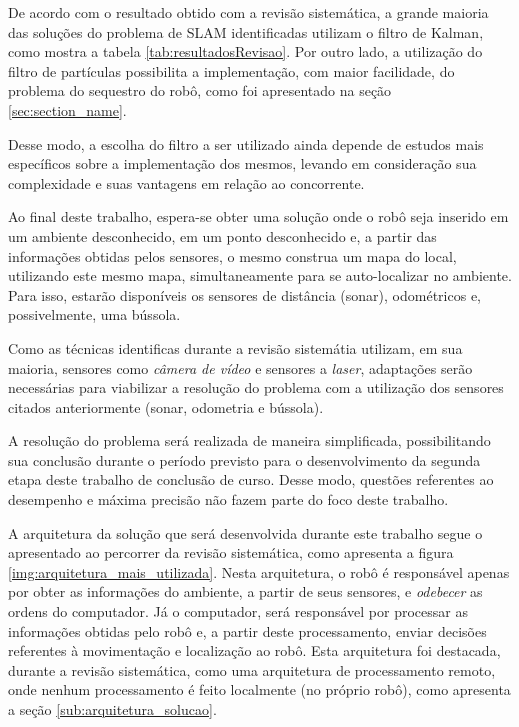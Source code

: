	De acordo com o resultado obtido com a revisão sistemática, a grande maioria das soluções do problema de SLAM identificadas utilizam o filtro de Kalman, como mostra a tabela \ref{tab:resultadosRevisao}. Por outro lado, a utilização do filtro de partículas possibilita a implementação, com maior facilidade, do problema do sequestro do robô, como foi apresentado na seção \ref{sec:section_name}.

	Desse modo, a escolha do filtro a ser utilizado ainda depende de estudos mais específicos sobre a implementação dos mesmos, levando em consideração sua complexidade e suas vantagens em relação ao concorrente.

	Ao final deste trabalho, espera-se obter uma solução onde o robô seja inserido em um ambiente desconhecido, em um ponto desconhecido e, a partir das informações obtidas pelos sensores, o mesmo construa um mapa do local, utilizando este mesmo mapa, simultaneamente para se auto-localizar no ambiente. Para isso, estarão disponíveis os sensores de distância (sonar), odométricos e, possivelmente, uma bússola.

	Como as técnicas identificas durante a revisão sistemátia utilizam, em sua maioria, sensores como \textit{câmera de vídeo} e sensores a \textit{laser}, adaptações serão necessárias para viabilizar a resolução do problema com a utilização dos sensores citados anteriormente (sonar, odometria e bússola).

	A resolução do problema será realizada de maneira simplificada, possibilitando sua conclusão durante o período previsto para o desenvolvimento da segunda etapa deste trabalho de conclusão de curso. Desse modo, questões referentes ao desempenho e máxima precisão não fazem parte do foco deste trabalho.

	A arquitetura da solução que será desenvolvida durante este trabalho segue o apresentado ao percorrer da revisão sistemática, como apresenta a figura \ref{img:arquitetura_mais_utilizada}. Nesta arquitetura, o robô é responsável apenas por obter as informações do ambiente, a partir de seus sensores, e \textit{odebecer} as ordens do computador. Já o computador, será responsável por processar as informações obtidas pelo robô e, a partir deste processamento, enviar decisões referentes à movimentação e localização ao robô. Esta arquitetura foi destacada, durante a revisão sistemática, como uma arquitetura de processamento remoto, onde nenhum processamento é feito localmente (no próprio robô), como apresenta a seção \ref{sub:arquitetura_solucao}.

